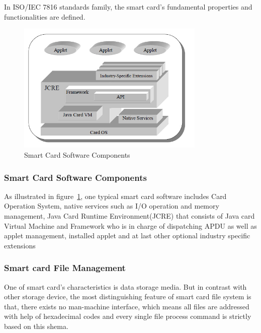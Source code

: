 \documentclass[]{llncs}
\begin{document}
In ISO/IEC 7816 standards family,  the smart card's fundamental properties and functionalities are defined.

\begin{figure}[!htbp]
	\centering
	\includegraphics[width=0.8\textwidth]{scc.jpg}
		\caption[ ]{Smart Card Software Components\cite{jcadg}}
	\label{fig:scc}
\end{figure}

\subsubsection{Smart Card Software Components}
As illustrated in figure~\ref{fig:scc}, one typical smart card software includes Card Operation System, native services such as I/O operation and memory management, Java Card Runtime Environment(JCRE) that consists of Java card  Virtual Machine and Framework who is in charge of dispatching APDU as well as applet management, installed applet and at last other optional industry specific extensions\cite{jcadg}
\subsubsection{Smart card File Management}
One of smart card's characteristics is data storage media. But in contrast with other storage device, the most distinguishing feature of smart card file system is that, there exists no man-machine interface\cite{handbuch}, which means all files are addressed with help of hexadecimal codes and every single file process command is strictly based on this shema.
\end{document}
